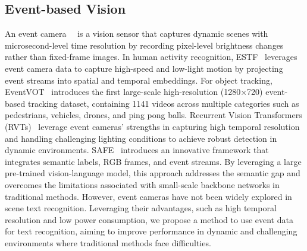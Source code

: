 \subsection{Event-based Vision}  
An event camera~\cite{gallego2020event}~\cite{jiang2024evcslr} is a vision sensor that captures dynamic scenes with microsecond-level time resolution by recording pixel-level brightness changes rather than fixed-frame images. 
In human activity recognition, ESTF~\cite{wang2024hardvs} leverages event camera data to capture high-speed and low-light motion by projecting event streams into spatial and temporal embeddings. 
For object tracking, EventVOT~\cite{wang2024eventvot} introduces the first large-scale high-resolution (1280$\times$720) event-based tracking dataset, containing 1141 videos across multiple categories such as pedestrians, vehicles, drones, and ping pong balls. 
Recurrent Vision Transformers (RVTs)~\cite{gehrig2023RVTs} leverage event cameras' strengths in capturing high temporal resolution and handling challenging lighting conditions to achieve robust detection in dynamic environments. 
SAFE~\cite{li2023semantic} introduces an innovative framework that integrates semantic labels, RGB frames, and event streams. By leveraging a large pre-trained vision-language model, this approach addresses the semantic gap and overcomes the limitations associated with small-scale backbone networks in traditional methods. However, event cameras have not been widely explored in scene text recognition. Leveraging their advantages, such as high temporal resolution and low power consumption, we propose a method to use event data for text recognition, aiming to improve performance in dynamic and challenging environments where traditional methods face difficulties.